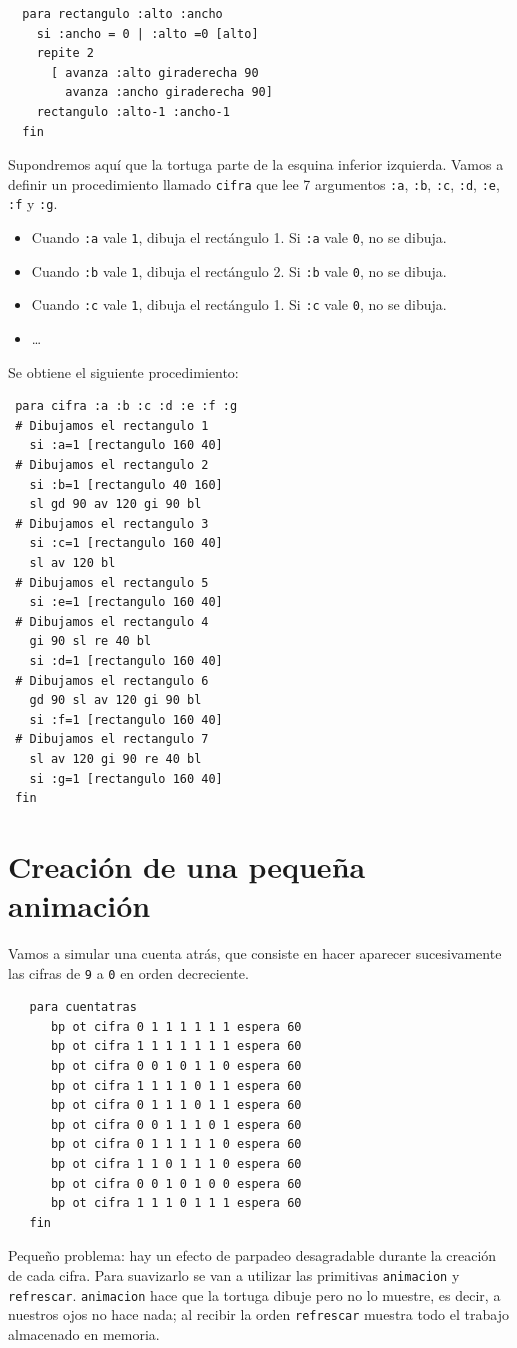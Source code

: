 \documentclass[12pt,twoside,spanish,a4paper]{report}
\begin{document}
\begin{verbatim}
  para rectangulo :alto :ancho
    si :ancho = 0 | :alto =0 [alto]
    repite 2
      [ avanza :alto giraderecha 90
        avanza :ancho giraderecha 90]
    rectangulo :alto-1 :ancho-1
  fin \end{verbatim}
Supondremos aqu\'i que la tortuga parte de la esquina inferior izquierda.
Vamos a definir un procedimiento llamado \texttt{cifra} que lee 7
argumentos \texttt{:a}, \texttt{:b}, \texttt{:c}, \texttt{:d}, \texttt{:e},
\texttt{:f} y \texttt{:g}.
\begin{itemize}
   \item Cuando \texttt{:a} vale \texttt{1}, dibuja el rect\'angulo 1. Si
      \texttt{:a} vale \texttt{0}, no se dibuja.
   \item Cuando \texttt{:b} vale \texttt{1}, dibuja el rect\'angulo 2. Si
      \texttt{:b} vale \texttt{0}, no se dibuja.
   \item Cuando \texttt{:c} vale \texttt{1}, dibuja el rect\'angulo 1. Si
      \texttt{:c} vale \texttt{0}, no se dibuja.
   \item \ldots{}
\end{itemize}
Se obtiene el siguiente procedimiento:
\begin{verbatim}
 para cifra :a :b :c :d :e :f :g
 # Dibujamos el rectangulo 1
   si :a=1 [rectangulo 160 40]
 # Dibujamos el rectangulo 2
   si :b=1 [rectangulo 40 160]
   sl gd 90 av 120 gi 90 bl
 # Dibujamos el rectangulo 3
   si :c=1 [rectangulo 160 40]
   sl av 120 bl
 # Dibujamos el rectangulo 5
   si :e=1 [rectangulo 160 40]
 # Dibujamos el rectangulo 4
   gi 90 sl re 40 bl
   si :d=1 [rectangulo 160 40]
 # Dibujamos el rectangulo 6
   gd 90 sl av 120 gi 90 bl
   si :f=1 [rectangulo 160 40]
 # Dibujamos el rectangulo 7
   sl av 120 gi 90 re 40 bl
   si :g=1 [rectangulo 160 40]
 fin \end{verbatim}

\section{Creaci\'on de una peque\~na animaci\'on}

Vamos a simular una cuenta atr\'as, que consiste en hacer aparecer sucesivamente
las cifras de \texttt{9} a \texttt{0} en orden decreciente.
\begin{verbatim}
   para cuentatras
      bp ot cifra 0 1 1 1 1 1 1 espera 60
      bp ot cifra 1 1 1 1 1 1 1 espera 60
      bp ot cifra 0 0 1 0 1 1 0 espera 60
      bp ot cifra 1 1 1 1 0 1 1 espera 60
      bp ot cifra 0 1 1 1 0 1 1 espera 60
      bp ot cifra 0 0 1 1 1 0 1 espera 60
      bp ot cifra 0 1 1 1 1 1 0 espera 60
      bp ot cifra 1 1 0 1 1 1 0 espera 60
      bp ot cifra 0 0 1 0 1 0 0 espera 60
      bp ot cifra 1 1 1 0 1 1 1 espera 60
   fin \end{verbatim}
Peque\~no problema: hay un efecto de parpadeo desagradable durante la
creaci\'on de cada cifra. Para suavizarlo se van a utilizar las primitivas
\texttt{animacion} y \texttt{refrescar}. \texttt{animacion} hace que la
tortuga dibuje pero no lo muestre, es decir, a nuestros ojos no hace nada;
al recibir la orden \texttt{refrescar} muestra todo el trabajo almacenado en
memoria.
\end{document}
